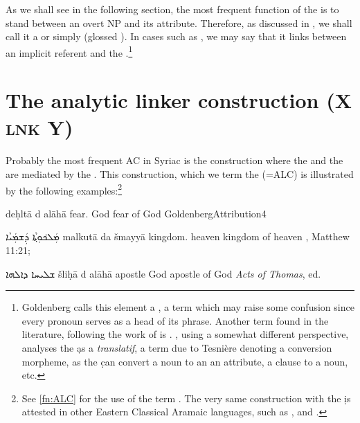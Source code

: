 {{As we shall see in the following section, the most frequent function of the   is to stand between an overt NP and its attribute. Therefore, as discussed in , we shall call it a  or simply  (glossed \lnk). In cases such as , we may say that it links between an implicit referent and the \secn.\footnote{Goldenberg calls this element a , a term which may raise some confusion since every pronoun serves as a head of its phrase. Another term found in the  literature, following the work of \citet{PennachiettiPronomi} is . \citet{WertheimerFunctions}, using a somewhat different perspective, analyses the \d as a \textit{translatif}, a term due to Tesnière denoting a conversion morpheme, as the \d can convert a noun to an an attribute, a clause to a noun, etc.}

\section{The analytic linker construction (X \textsc{lnk} Y)} \label{ss:syr_ALC}

\largerpage[2] 
Probably the most frequent AC in Syriac is the construction where the \prim and the \secn are mediated by the  . This construction, which we term the  (=ALC)  is illustrated by the following examples:\footnote{See \vref{fn:ALC} for the use of the term . The very same construction with the \lnk* \d is attested in other Eastern Classical Aramaic languages, such as \CMand \citep{HaberlRelative}, and \JBA \citep[93, \S 4.3]{BarAsherJBA}.}

{deḥltā d\cb{} alāhā}
{fear.\emp{} \lnk{} God}
{fear of God\footnotemark}
{GoldenbergAttribution}{4}\antipar\antipar


\newpage
{}
{ܡܲܠܟ݁ܘܼܬ݂ܵܐ ܕܲܫܡܲܝܵܐ}
{malkutā da\cb{} šmayyā}
{kingdom.\emp{} \lnk\cb{} heaven}
{kingdom of heaven}
{\Pesh, Matthew 11:21; \cite[61, \S 73a]{MuraokaSyriac}}

{ܫܠܝܚܐ ܕܐܠܗܐ}
{šliḥā d\cb{} alāhā}
{apostle \lnk\cb{} God}
{apostle of God}
{\textit{Acts of Thomas}, ed.\ \cite[]{WrightActs}}


}}
